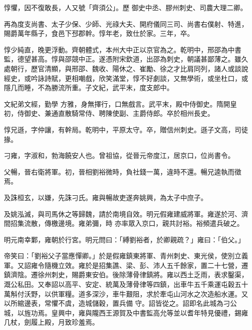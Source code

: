\begin{pinyinscope}
 惇懼，因不復敢長，人又號「齊須公」。歷
 御史中丞、膠州刺史、司農大理二卿。



 再為度支尚書、太子少保、少師、光祿大夫、開府儀同三司、尚書右僕射、特進，賜爵萬年縣子，食邑下邳郡幹。惇年老，致仕於家。三年，卒。



 惇少純直，晚更浮動。齊朝體式，本州大中正以京官為之。乾明中，邢邵為中書監，德望甚高。惇與邵競中正。遂憑附宋欽道，出邵為刺史，朝議甚鄙薄之。雖久處朝行，歷官清顯，與邢邵、魏收、陽休之、崔勵、徐之才比肩同列，諸人或談說經史，或吟詠詩賦，更相嘲戲，欣笑滿堂，惇不好劇談，又無學術，或坐杜口，或隱几而睡，不為勝流所重。子文紀，武平末，度支郎中。



 文紀弟文經，勤學
 方雅，身無擇行，口無戲言。武平末，殿中侍御史。隋開皇初，侍御史、兼通直散騎常侍、聘陳使副、主爵侍郎。卒於相州長史。



 惇兄遜，字仲讓，有幹局。乾明中，平原太守。卒，贈信州刺史。遜子文高，司徒掾。



 刁雍，字淑和，勃海饒安人也。曾祖協，從晉元帝度江，居京口，位尚書令。



 父暢，晉右衛將軍。初，晉相劉裕微時，負社錢一萬，違時不還。暢兄逵執而徵焉。



 及誅桓玄，以嫌，先誅刁氏。雍與暢故吏遂奔姚興，為太子中庶子。



 及姚泓滅，與司馬休之等歸魏，請於南境自效。明元假雍建威將軍。雍遂於河、濟間招集流散，傳檄邊境。雍弟彌，時
 亦率眾入京口，親共討裕。裕頻遣兵破之。



 明元南幸鄴，雍朝於行宮。明元問曰：「縛劉裕者，於卿親疏？」雍曰：「伯父。」



 帝笑曰：「劉裕父子當應憚卿。」於是假雍鎮東將軍、青州刺史、東光侯，使別立義軍。又詔雍令隨機立效。雍於是招集譙、梁、彭、沛人五千餘家，置二十七營，遷鎮濟陰。遷徐州刺史，賜爵東安伯。後除薄骨律鎮將。雍以西土乏雨，表求鑿渠，溉公私田。又奉詔以高平、安定、統萬及薄骨律等四鎮，出車牛五千乘運屯穀五十萬斛付沃野，以供軍糧。道多深沙，車牛艱阻，求於牽屯山河水之次造船水運。又以所綰邊表，常懼不虞，造城儲穀，置兵備
 守。詔皆從之。詔即名此城為刁公城，以旌功焉。皇興中，雍與隴西王源賀及中書監高允等並以耆年特見優禮，錫雍几杖，劍履上殿，月致珍羞焉。




\end{pinyinscope}
